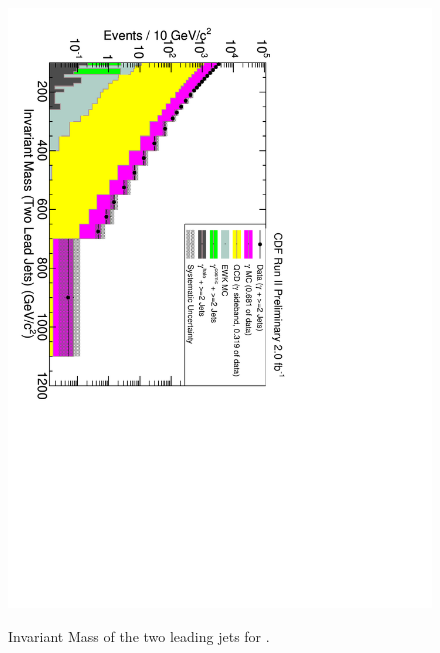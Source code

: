 \documentclass[11pt]{article}
\begin{document}
\begin{figure}
\begin{centering}
 {
\includegraphics[scale=0.7]{plot2_jetsInvMass.pdf} }
\caption{Invariant Mass of the two leading jets for \photwojet.}
\label{fig-p2jJetsInvMass}
\end{centering}
\end{figure}
\end{document}
